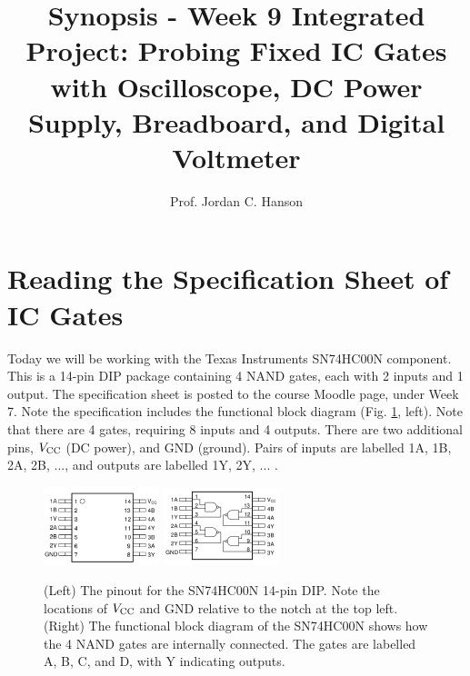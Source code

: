 \documentclass{article}
\begin{document}
\title{Synopsis - Week 9 Integrated Project: Probing Fixed IC Gates with Oscilloscope, DC Power Supply, Breadboard, and Digital Voltmeter}
\author{Prof. Jordan C. Hanson}

\maketitle

\section{Reading the Specification Sheet of IC Gates}

Today we will be working with the Texas Instruments SN74HC00N component.  This is a 14-pin DIP package containing 4 NAND gates, each with 2 inputs and 1 output.  The specification sheet is posted to the course Moodle page, under Week 7.  Note the specification includes the functional block diagram (Fig. \ref{fig:count1}, left).  Note that there are 4 gates, requiring 8 inputs and 4 outputs.  There are two additional pins, $V_{\rm CC}$ (DC power), and GND (ground).  Pairs of inputs are labelled 1A, 1B, 2A, 2B, ..., and outputs are labelled 1Y, 2Y, ... .

\begin{figure}[ht]
\centering
\includegraphics[width=0.3\textwidth]{4NAND_2.png} \hspace{1cm}
\includegraphics[width=0.3\textwidth]{4NAND.png}
\caption{\label{fig:count1} (Left)  The pinout for the SN74HC00N 14-pin DIP.  Note the locations of $V_{\rm CC}$ and GND relative to the notch at the top left.  (Right)  The functional block diagram of the SN74HC00N shows how the 4 NAND gates are internally connected.  The gates are labelled A, B, C, and D, with Y indicating outputs.}
\end{figure}
\end{document}
